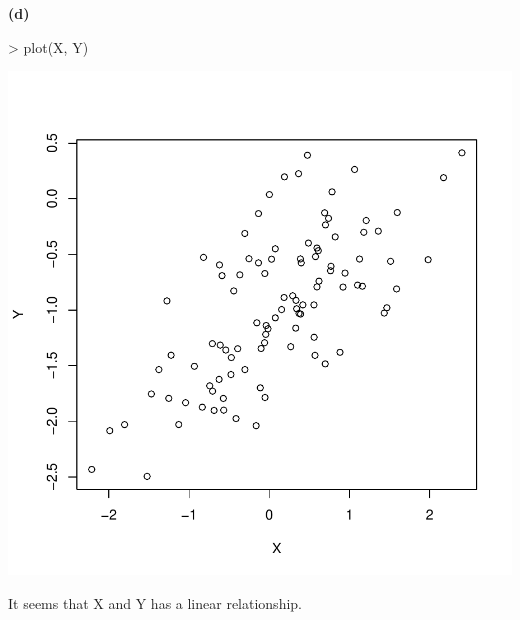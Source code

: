 \documentclass[a4paper]{article}
\renewcommand{\part}[1] {\vspace{.10in} {\bf (#1)}}
\begin{document}
\part{d}
\begin{Schunk}
\begin{Sinput}
> plot(X, Y)
\end{Sinput}
\end{Schunk}
\includegraphics{mutivariblelm-13d}
\begin{enumerate}
{\color{red}
\item It seems that X and Y has a linear relationship.
}
\end{enumerate}
\end{document}
